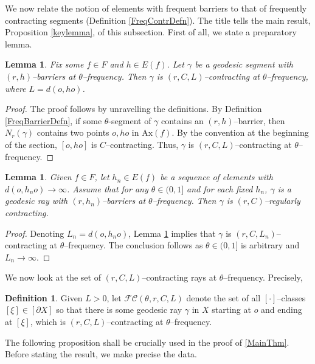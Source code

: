 \documentclass{amsart}
\newtheorem{lem}[thm]{Lemma}
\theoremstyle{definition}
\newtheorem{defn}[thm]{Definition}
\theoremstyle{remark}
\newcommand{\U}{ X}
\newcommand{\pU}{\partial{  X}}
\newcommand{\ax}{\mathrm{Ax}}
\begin{document}
We now relate the   notion of elements with frequent barriers  to that of frequently contracting segments (Definition \ref{FreqContrDefn}). The title tells the main result, Proposition \ref{keylemma}, of  this subsection. First of all, we state a preparatory lemma.



\begin{lem}\label{fBarrierimplyfContract}
Fix some $f\in F$ and $h\in E(f)$. Let $\gamma$ be a geodesic segment with  $(r,h)$--barriers at $\theta$--frequency.  Then $\gamma$ is  $(r, C,L)$–contracting at $\theta$--frequency, where $L=d(o,ho)$.  
\end{lem}
\begin{proof}The proof follows by unravelling the definitions. By Definition \ref{FreqBarrierDefn},  if some $\theta$-segment of $\gamma$ contains an $(r,h)$--barrier, then $N_r(\gamma)$ contains two points $o,ho$ in $\ax(f)$. By the convention at the beginning of the section, $[o,ho]$ is $C$--contracting. Thus, $\gamma$ is  $(r, C,L)$–contracting at $\theta$--frequency.
\end{proof}

 
\begin{lem}\label{fBarrierimplyfContractRay}
Given $f\in F$, let $h_n\in E(f)$ be a sequence of elements with $d(o,h_no)\to\infty$.  Assume that  for any $\theta\in (0,1]$ and for each fixed $h_n$, $\gamma$ is a geodesic ray with  $(r, h_n)$--barriers at $\theta$--frequency. Then $\gamma$ is $(r, C)$–regularly contracting.
\end{lem}
\begin{proof}
Denoting $L_n=d(o,h_no)$, Lemma \ref{fBarrierimplyfContract} implies that $\gamma$ is $(r, C,L_n)$–contracting at $\theta$--frequency.  The conclusion follows as $\theta\in (0,1]$ is arbitrary and $L_n\to\infty$.  
\end{proof}

 
 
We now look at the set of   $(r,C,L)$--contracting rays at $\theta$--frequency. Precisely, 
\begin{defn}\label{defn:FC}
Given $L>0$, let $\mathcal{FC}(\theta,r, C,L)$  denote the set of  all $[\cdot]$--classes   $[\xi]\in [\pU]$ so that there is some geodesic ray $\gamma$ in $\U$ starting at $o$ and ending at $[\xi]$, which  is $(r,C,L)$--contracting at $\theta$--frequency.     
\end{defn}

The following proposition  shall be crucially used in the proof of  \ref{MainThm}. Before stating the result, we make precise the data.  %
 
\end{document}

